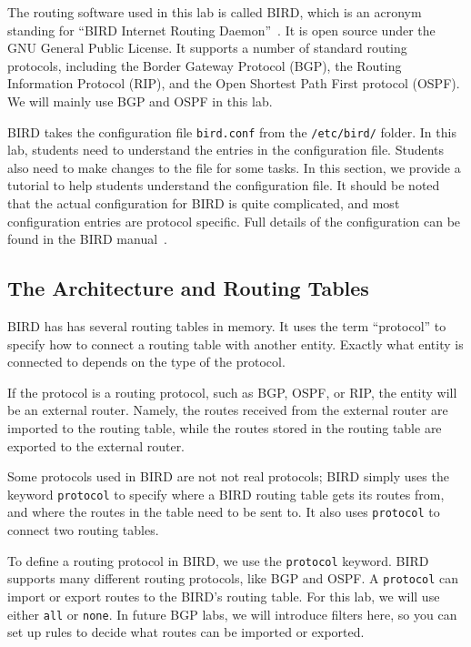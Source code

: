The routing software used in this lab is called BIRD, which is 
an acronym standing for ``BIRD Internet Routing Daemon''~\cite{bird}.
It is open source under the GNU General Public License. It 
supports a number of standard routing protocols, including 
the Border Gateway Protocol (BGP),
the Routing Information Protocol (RIP),
and the Open Shortest Path First protocol (OSPF). We will
mainly use BGP and OSPF in this lab. 


BIRD takes the configuration
file \texttt{bird.conf} from the \texttt{/etc/bird/} folder.
In this lab, students need to understand the entries in the 
configuration file. Students also need to make changes
to the file for some tasks. In this section, we provide 
a tutorial to help students understand the 
configuration file. It should be noted that the actual configuration
for BIRD is quite complicated, and most configuration entries 
are protocol specific. Full details of the configuration 
can be found in the BIRD manual~\cite{birdmanual}.


\subsection{The Architecture and Routing Tables} 

BIRD has has several routing tables in memory. It uses
the term ``protocol'' to specify how 
to connect a routing table with another entity. Exactly
what entity is connected to depends on the type of the protocol.

If the protocol is a routing protocol, 
such as BGP, OSPF, or RIP, the entity will be an external router.
Namely, the routes received from the external router
are imported to the routing table, while 
the routes stored in the routing table are exported 
to the external router.

Some protocols used in BIRD are not not real protocols; 
BIRD simply uses the keyword \texttt{protocol} to specify where
a BIRD routing table gets its routes from, and where the routes
in the table need to be sent to. It also uses \texttt{protocol} 
to connect two routing tables. 

To define a routing protocol in BIRD, we use the \texttt{protocol} keyword.
BIRD supports many different routing protocols, like BGP and OSPF. A
\texttt{protocol} can import or export routes to the BIRD's routing table.
For this lab, we will use either \texttt{all} or \texttt{none}. In future
BGP labs, we will introduce filters here, so you can set up
rules to decide what routes can be imported or exported.


